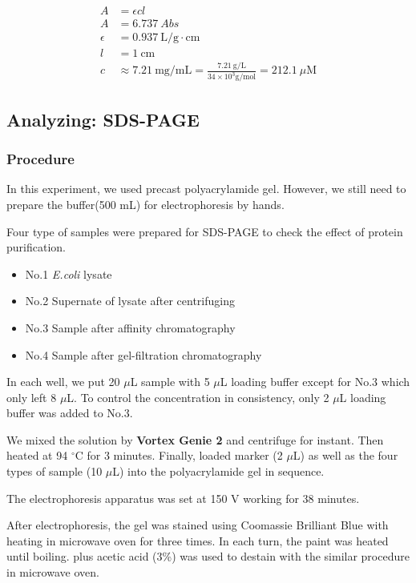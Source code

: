 \documentclass{report}
\begin{document}
\begin{align}
    A &= \epsilon cl \\
    A &= 6.737\ Abs \\
    \epsilon &= 0.937\ \text{L/g}\cdot\text{cm} \\
    l &= 1\ \text{cm}\\
    c &\approx 7.21\ \text{mg/mL}=\frac{7.21\ \text{g/L}}{34\times 10^3 \text{g/mol}}=212.1\ \mu\text{M}    
\end{align}


\subsection{Analyzing: SDS-PAGE}

\subsubsection{Procedure}
In this experiment, we used precast polyacrylamide gel.
However, we still need to prepare the buffer(500 mL) for electrophoresis by hands.

Four type of samples were prepared for SDS-PAGE to check the effect of protein purification.

\begin{itemize}
    \item No.1 \textit{E.coli} lysate
    \item No.2 Supernate of lysate after centrifuging
    \item No.3 Sample after affinity chromatography
    \item No.4 Sample after gel-filtration chromatography
\end{itemize}

In each well, we put 20 $\mu$L sample with 5 $\mu$L loading buffer except for No.3 which only left 8 $\mu$L.
To control the concentration in consistency, only 2 $\mu$L loading buffer was added to No.3.

We mixed the solution by \textbf{Vortex Genie 2} and centrifuge for instant.
Then heated at 94 $^\circ$C for 3 minutes.
Finally, loaded marker (2 $\mu$L) as well as the four types of sample (10 $\mu$L) into the polyacrylamide gel in sequence.

The electrophoresis apparatus was set at 150 V working for 38 minutes.

After electrophoresis, the gel was stained using Coomassie Brilliant Blue with heating in microwave oven for three times.
In each turn, the paint was heated until boiling.
 plus acetic acid (3\%) was used to destain with the similar procedure in microwave oven.
\end{document}
